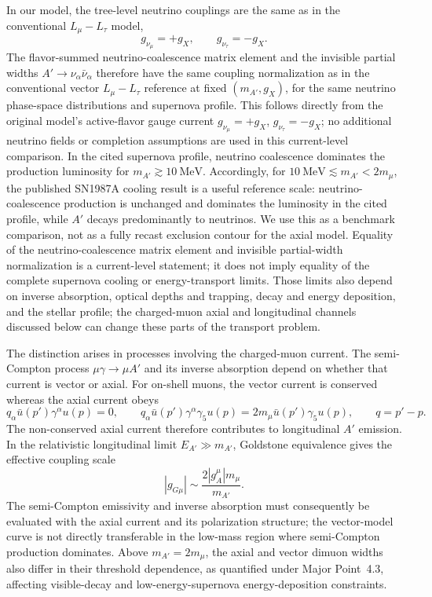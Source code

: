 \documentclass[12pt,a4paper]{article}
\begin{document}
\medskip
{}

In our model, the tree-level neutrino couplings are the same as in the conventional \(L_\mu-L_\tau\) model,
\[
g_{\nu_\mu}=+g_X,\qquad g_{\nu_\tau}=-g_X.
\]
The flavor-summed neutrino-coalescence matrix element and the invisible partial widths \(A'\to\nu_\alpha\bar\nu_\alpha\) therefore have the same coupling normalization as in the conventional vector \(L_\mu-L_\tau\) reference at fixed \((m_{A'},g_X)\), for the same neutrino phase-space distributions and supernova profile. This follows directly from the original model's active-flavor gauge current \(g_{\nu_\mu}=+g_X\), \(g_{\nu_\tau}=-g_X\); no additional neutrino fields or completion assumptions are used in this current-level comparison. In the cited supernova profile, neutrino coalescence dominates the production luminosity for \(m_{A'}\gtrsim10~\mathrm{MeV}\). Accordingly, for \(10~\mathrm{MeV}\lesssim m_{A'}<2m_\mu\), the published SN1987A cooling result is a useful reference scale: neutrino-coalescence production is unchanged and dominates the luminosity in the cited profile, while \(A'\) decays predominantly to neutrinos. We use this as a benchmark comparison, not as a fully recast exclusion contour for the axial model. Equality of the neutrino-coalescence matrix element and invisible partial-width normalization is a current-level statement; it does not imply equality of the complete supernova cooling or energy-transport limits. Those limits also depend on inverse absorption, optical depths and trapping, decay and energy deposition, and the stellar profile; the charged-muon axial and longitudinal channels discussed below can change these parts of the transport problem.

\medskip
{}

The distinction arises in processes involving the charged-muon current. The semi-Compton process \(\mu\gamma\to\mu A'\) and its inverse absorption depend on whether that current is vector or axial. For on-shell muons, the vector current is conserved whereas the axial current obeys
\[
q_\alpha\bar u(p')\gamma^\alpha u(p)=0,\qquad
q_\alpha\bar u(p')\gamma^\alpha\gamma_5u(p)
=2m_\mu\bar u(p')\gamma_5u(p),
\qquad q=p'-p.
\]
The non-conserved axial current therefore contributes to longitudinal \(A'\) emission. In the relativistic longitudinal limit \(E_{A'}\gg m_{A'}\), Goldstone equivalence gives the effective coupling scale
\[
|g_{G\mu}|\sim\frac{2|g_A^\mu|m_\mu}{m_{A'}}.
\]
The semi-Compton emissivity and inverse absorption must consequently be evaluated with the axial current and its polarization structure; the vector-model curve is not directly transferable in the low-mass region where semi-Compton production dominates. Above \(m_{A'}=2m_\mu\), the axial and vector dimuon widths also differ in their threshold dependence, as quantified under Major Point~4.3, affecting visible-decay and low-energy-supernova energy-deposition constraints.
\end{document}
